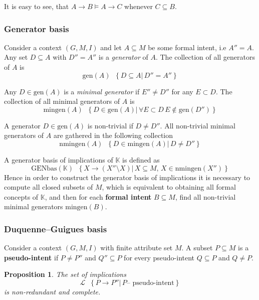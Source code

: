 \documentclass[a4paper]{article}
\newcommand{\obj}[1]{{\left\{ #1 \right \}}}
\newcommand{\brac}[1]{{\left ( #1 \right )}}
\newcommand{\induc}[1]{{\left . #1 \right \vert}}
\newcommand{\Lcal}{\mathcal{L}}
\newcommand{\Ctx}{\mathbb{K}}
\newtheorem{prop}{Proposition}
\newcommand{\defn}{\mathop{\overset{\Delta}{=}}\nolimits}
\begin{document}
It is easy to see, that $A\to B\models A\to C$ whenever $C\subseteq B$.

\subsubsection{Generator basis} %
\label{ssub:generator_basis}

Consider a context $(G,M,I)$ and let $A\subseteq M$ be some formal intent, i.e $A'' = A$. Any set $D\subseteq A$ with $D'' = A''$ is a \emph{generator} of $A$. The collection of all generators of $A$ is \[\text{gen}(A) \defn \obj{\induc{D\subseteq A}\, D'' = A'' }\]

Any $D\in \text{gen}(A)$ is a \emph{minimal generator} if $E''\neq D''$ for any $E\subset D$. The collection of all minimal generators of $A$ is \[\text{mingen}(A) \defn \obj{ \induc{D\in \text{gen}(A)}\, \forall E\subset D\, E\notin \text{gen}(D'')}\]

A generator $D\in\text{gen}(A)$ is non-trivial if $D\neq D''$. All non-trivial minimal generators of $A$ are gathered in the following collection \[\text{nmingen}(A) \defn \obj{\induc{D\in\text{mingen}(A)}\,D\neq D'' }\]

A generator basis of implications of $\Ctx$ is defined as \[\text{GENbas}(\Ctx)\defn \obj{\induc{ X\to \brac{X''\setminus X} }\, X\subseteq M,\, X\in \text{nmingen}(X'')}\] Hence in order to construct the generator basis of implications it is necessary to compute all closed subsets of $M$, which is equivalent to obtaining all formal concepts of $\Ctx$, and then for each \textbf{formal intent} $B\subseteq M$, find all non-trivial minimal generators $\text{mingen}(B)$.


\subsubsection{Duquenne–Guigues basis} %
\label{ssub:duquenne_guigues_basis}

Consider a context $(G,M,I)$ with finite attribute set $M$. A subset $P\subseteq M$ is a \textbf{pseudo-intent} if $P\neq P''$ and $Q''\subseteq P$ for every pseudo-intent $Q\subseteq P$ and $Q\neq P$.

\begin{prop} The set of implications \[\Lcal \defn \obj{\induc{ P\to P'' }\, P \text{-- pseudo-intent} }\] is non-redundant and complete.
\end{prop}
\end{document}
